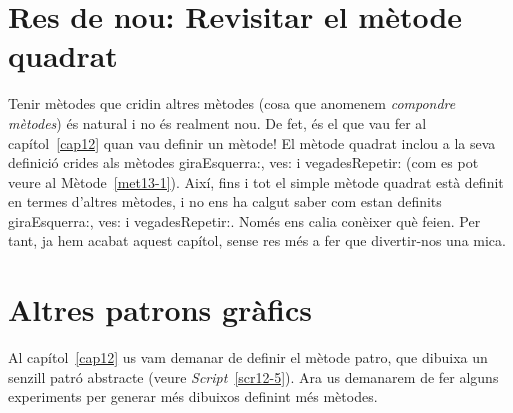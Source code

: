\section{Res de nou: Revisitar el mètode \textsf{quadrat}}
Tenir mètodes que cridin altres mètodes (cosa que anomenem \emph{compondre mètodes}) és natural i no és realment nou. De fet, és el que vau fer al capítol~\ref{cap12} quan vau definir un mètode! El mètode \textsf{quadrat} inclou a la seva definició crides als mètodes \textsf{giraEsquerra:}, \textsf{ves:} i \textsf{vegadesRepetir:} (com es pot veure al Mètode~\ref{met13-1}). Així, fins i tot el simple mètode \textsf{quadrat} està definit en termes d'altres mètodes, i no ens ha calgut saber com estan definits \textsf{giraEsquerra:}, \textsf{ves:} i \textsf{vegadesRepetir:}. Només ens calia conèixer què feien. Per tant, ja hem acabat aquest capítol, sense res més a fer que divertir-nos una mica.

\section{Altres patrons gràfics}
Al capítol~\ref{cap12} us vam demanar de definir el mètode \textsf{patro}, que dibuixa un senzill patró abstracte (veure \emph{Script}~\ref{scr12-5}). Ara us demanarem de fer alguns experiments per generar més dibuixos definint més mètodes. 

